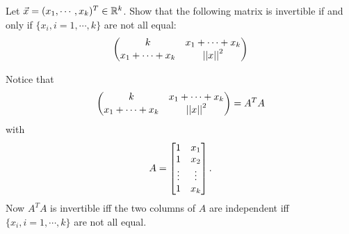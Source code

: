 \documentclass[pdf,9pt]{beamer}
\begin{document}
\begin{frame}[fragile]
   \begin{problem}
       Let $\vec{x}=(x_1,\cdots,x_k)^T\in \mathbb{R}^k$.
       Show that the following matrix is invertible if and only if $\{x_i,i=1,\cdots, k\}$ are not all equal:
       \begin{align*}
	   \begin{pmatrix}
	   k & x_1+\cdots+x_k\cr
	   x_1+\cdots+x_k &  \left|\left| x \right|\right|^2
       \end{pmatrix}
       \end{align*}
   \end{problem}
   \vfill
   \pause
   \begin{solution}
      Notice that 
       \begin{align*}
	   \begin{pmatrix}
	   k & x_1+\cdots+x_k\cr
	   x_1+\cdots+x_k &  \left|\left| x \right|\right|^2
       \end{pmatrix} = A^T A
       \end{align*}
       with 
       \begin{align*}
       A =     
       \begin{bmatrix} 
	1      & x_1\cr
	1      & x_2\cr
	\vdots & \vdots\cr
	1      & x_k\cr
       \end{bmatrix}.
       \end{align*}
       Now $A^TA$ is invertible  iff the two columns of $A$ are independent iff  $\{x_i,i=1,\cdots, k\}$ are not all equal.
       \myQED
   \end{solution}
\end{frame}
\end{document}
